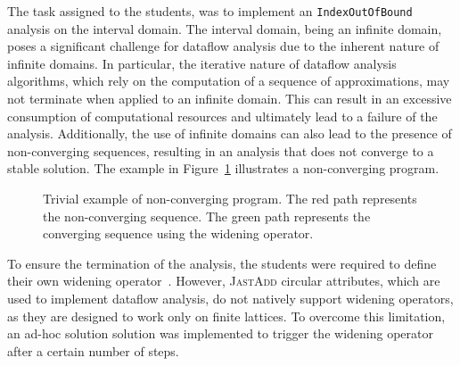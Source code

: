 The task assigned to the students, was to implement an \texttt{IndexOutOfBound} analysis on the interval domain.
The interval domain, being an infinite domain, poses a significant challenge for
dataflow analysis due to the inherent nature of infinite domains. In particular,
the iterative nature of dataflow analysis algorithms, which rely on the computation
of a sequence of approximations, may not terminate when applied to an infinite domain.
This can result in an excessive consumption of computational resources and ultimately
lead to a failure of the analysis. Additionally, the use of infinite domains can also
lead to the presence of non-converging sequences, resulting in an analysis that does
not converge to a stable solution. The example in Figure~\ref{fig:nonConverging}
illustrates a non-converging program.
\begin{figure}
	\centering
	\caption{\label{fig:nonConverging} Trivial example of non-converging program. The {\color{red}red} path represents the
  non-converging sequence. The {\color{ForestGreen}green} path represents the converging sequence using the widening operator.
  }
\end{figure}

To ensure the termination of the analysis, the students were required to
define their own widening operator~\cite{Bagnara2003Widening}.
However, \textsc{JastAdd} circular attributes, which are used to implement dataflow
analysis, do not natively support widening operators, as they are designed
to work only on finite lattices. To overcome this limitation, an ad-hoc solution
solution was implemented to trigger the widening operator after a certain
number of steps.

